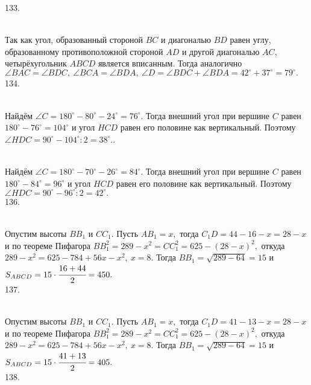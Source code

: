 133. \begin{figure}[ht!]
\end{figure}\\
Так как угол, образованный стороной $BC$ и диагональю $BD$ равен углу, образованному противоположной стороной $AD$ и другой диагональю $AC,$ четырёхугольник $ABCD$ является вписанным. Тогда аналогично $\angle BAC=\angle BDC,\ \angle BCA=\angle BDA,\ \angle D=\angle BDC+\angle BDA=42^\circ+37^\circ=79^\circ.$\\
134. \begin{figure}[ht!]
\end{figure}\\
Найдём $\angle C=180^\circ-80^\circ-24^\circ=76^\circ.$ Тогда внешний угол при вершине $C$ равен $180^\circ-76^\circ=104^\circ$ и угол $HCD$ равен его половине как вертикальный. Поэтому $\angle HDC=90^\circ-104^\circ:2=38^\circ.$\newpage{}. \begin{figure}[ht!]
\end{figure}\\
Найдём $\angle C=180^\circ-70^\circ-26^\circ=84^\circ.$ Тогда внешний угол при вершине $C$ равен $180^\circ-84^\circ=96^\circ$ и угол $HCD$ равен его половине как вертикальный. Поэтому $\angle HDC=90^\circ-96^\circ:2=42^\circ.$\\
136. \begin{figure}[ht!]
\end{figure}\\
Опустим высоты $BB_1$ и $CC_1.$ Пусть $AB_1=x,$ тогда $C_1D=44-16-x=28-x$ и по теореме Пифагора $BB_1^2=289-x^2=CC_1^2=625-(28-x)^2,$ откуда
$289-x^2=625-784+56x-x^2,\ x=8.$ Тогда $BB_1=\sqrt{289-64}=15$ и $S_{ABCD}=15\cdot\cfrac{16+44}{2}=450.$\\
137. \begin{figure}[ht!]
\end{figure}\\
Опустим высоты $BB_1$ и $CC_1.$ Пусть $AB_1=x,$ тогда $C_1D=41-13-x=28-x$ и по теореме Пифагора $BB_1^2=289-x^2=CC_1^2=625-(28-x)^2,$ откуда
$289-x^2=625-784+56x-x^2,\ x=8.$ Тогда $BB_1=\sqrt{289-64}=15$ и $S_{ABCD}=15\cdot\cfrac{41+13}{2}=405.$\\
138. \begin{figure}[ht!]
\end{figure}\\
